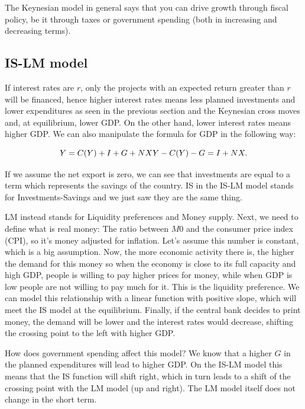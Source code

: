 The Keynesian model in general says that you can drive growth through fiscal policy, be it through taxes or government spending (both in increasing and decreasing terms).

\subsection{IS-LM model}

If interest rates are $r$, only the projects with an expected return greater than $r$ will be financed, hence higher interest rates means less planned investments and lower expenditures as seen in the previous section and the Keynesian cross moves and, at equilibrium, lower GDP. On the other hand, lower interest rates means higher GDP.
We can also manipulate the formula for GDP in the following way:

\begin{equation}
    Y = C(Y) + I + G + NX \\
    Y - C(Y) - G = I + NX.
\end{equation}

If we assume the net export is zero, we can see that investments are equal to a term which represents the savings of the country.
IS in the IS-LM model stands for Investments-Savings and we just saw they are the same thing.

LM instead stands for Liquidity preferences and Money supply. Next, we need to define what is real money: The ratio between $M0$ and the consumer price index (CPI), so it's money adjusted for inflation. Let's assume this number is constant, which is a big assumption. Now, the more economic activity there is, the higher the demand for this money so when the economy is close to its full capacity and high GDP, people is willing to pay higher prices for money, while when GDP is low people are not willing to pay much for it. This is the liquidity preference. We can model this relationship with a linear function with positive slope, which will meet the IS model at the equilibrium. Finally, if the central bank decides to print money, the demand will be lower and the interest rates would decrease, shifting the crossing point to the left with higher GDP.

How does government spending affect this model? We know that a higher $G$ in the planned expenditures will lead to higher GDP. On the IS-LM model this means that the IS function will shift right, which in turn leads to a shift of the crossing point with the LM model (up and right). The LM model itself does not change in the short term.

